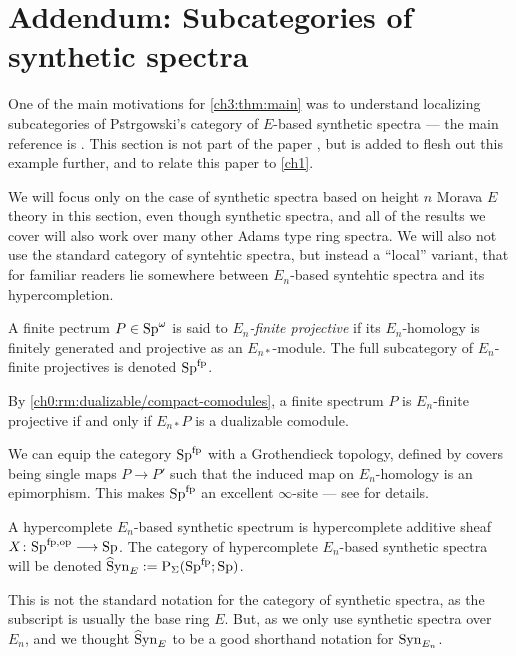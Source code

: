 
\section{Addendum: Subcategories of synthetic spectra}
\label{ch3:addendum}

One of the main motivations for \cref{ch3:thm:main} was to understand localizing subcategories of Pstr\a{}gowski's category of $E$-based synthetic spectra --- the main reference is \cite{pstragowski_2022}. This section is not part of the paper \cite{aambo_2024_localizing}, but is added to flesh out this example further, and to relate this paper to \cref{ch1}. 

We will focus only on the case of synthetic spectra based on height $n$ Morava $E$ theory in this section, even though synthetic spectra, and all of the results we cover will also work over many other Adams type ring spectra. We will also not use the standard category of syntehtic spectra, but instead a ``local'' variant, that for familiar readers lie somewhere between $E_n$-based syntehtic spectra and its hypercompletion. 

\begin{definition}
    A finite pectrum $P\in \mathrm{Sp}^\omega$ is said to \emph{$E_n$-finite projective} if its $E_n$-homology is finitely generated and projective as an $E_{n*}$-module. The full subcategory of $E_n$-finite projectives is denoted $\mathrm{Sp}^{\mathrm{fp}}$. 
\end{definition}

\begin{remark}
    By \cref{ch0:rm:dualizable/compact-comodules}, a finite spectrum $P$ is $E_n$-finite projective if and only if $E_{n*}P$ is a dualizable comodule. 
\end{remark}

We can equip the category $\mathrm{Sp}^{\mathrm{fp}}$ with a Grothendieck topology, defined by covers being single maps $P\to P'$ such that the induced map on $E_n$-homology is an epimorphism. This makes $\mathrm{Sp}^{\mathrm{fp}}$ an excellent $\infty$-site --- see \cite[Section 2.3]{pstragowski_2022} for details. 

\begin{definition}
    A hypercomplete $E_n$-based synthetic spectrum is hypercomplete additive sheaf $X\colon \mathrm{Sp}^{\mathrm{fp}, \mathrm{op}}\longrightarrow \mathrm{Sp}$. The category of hypercomplete $E_n$-based synthetic spectra will be denoted $\widehat{\mathrm{S}}\mathrm{yn}_{E} := \mathrm{P}_\Sigma(\mathrm{Sp}^{\mathrm{fp}};\mathrm{Sp})$. 
\end{definition}

\begin{remark}
    This is not the standard notation for the category of synthetic spectra, as the subscript is usually the base ring $E$. But, as we only use synthetic spectra over $E_n$, and we thought $\widehat{\mathrm{S}}\mathrm{yn}_{E}$ to be a good shorthand notation for $\mathrm{Syn}_{E_n}$.  
\end{remark}

